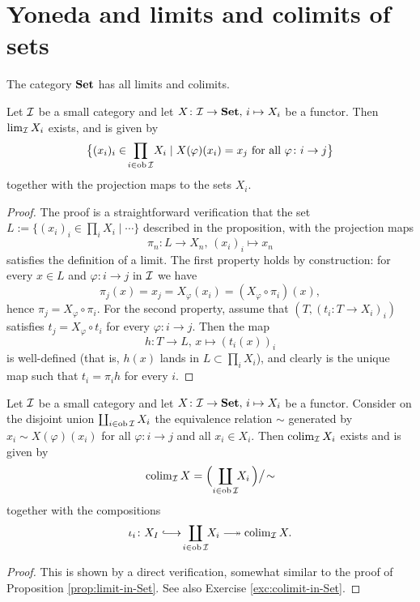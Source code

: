 \section{Yoneda and limits and colimits of sets}

The category $\mathbf{Set}$ has all limits and colimits.

\begin{proposition}\label{prop:limit-in-Set}
Let ${\mathcal{I}}$ be a small category and let $X\colon {\mathcal{I}} \to \mathbf{Set},\, i \mapsto X_i$ be a functor. Then
$\lim_{\mathcal{I}} X_i$ exists, and is given by
\[
	\big\{ (x_i)_i \in \! \prod_{i\in \operatorname{ob}{\mathcal{I}}} \! X_i \mid
	\text{$X(\varphi)(x_i) = x_j$ for all $\varphi\colon i \to j$} \big\}
\]
together with the projection maps to the sets $X_i$.
\end{proposition}

\begin{proof}The proof is a straightforward verification that the set $L:=\{ (x_i)_i \in \! \prod_{i} \! X_i \mid \cdots \}$  described in the proposition, with the projection maps
\[
	\pi_n\colon L\to X_n,\, (x_i)_i \mapsto x_n
\]
satisfies the definition of a limit. The first property holds by construction: for every $x \in L$ and $\varphi\colon i \to j$ in ${\mathcal{I}}$ we have
\[
	\pi_j (x) = x_j = X_\varphi (x_i) = ( X_\varphi \circ \pi_i )(x),
\]
hence $\pi_j = X_\varphi \circ \pi_i$. For the second property, assume that $(T,(t_i\colon T\to X_i)_i)$ satisfies 
$t_j = X_\varphi \circ t_i$ for every $\varphi\colon i\to j$. Then the map 
\[
	h \colon T \to L,\, x \mapsto  (t_i(x))_i 
\]
is well-defined (that is, $h(x)$ lands in $L \subset \prod_i X_i$), and clearly is the unique map such that $t_i = \pi_i h$ for every $i$.
\end{proof}



\begin{proposition}\label{prop:colimit-in-Set}
Let ${\mathcal{I}}$ be a small category and let $X\colon {\mathcal{I}} \to \mathbf{Set},\, i \mapsto X_i$ be a functor. Consider on the disjoint union 
$\coprod_{i\in \operatorname{ob}{\mathcal{I}}}  X_i$
the equivalence relation $\sim$ generated by $x_i \sim X(\varphi)(x_i)$ for all $\varphi\colon i \to j$ and all $x_i \in X_i$. Then 
$\operatorname{colim}_{{\mathcal{I}}} X_i$ exists and is given by
\[
	\operatorname{colim}_{{\mathcal{I}}} X = \Big( \!\coprod_{i\in \operatorname{ob}{\mathcal{I}}}\!\!  X_i\, \Big) \big/ \! \sim
\]
together with the compositions
\[
	\iota_i \colon X_I \longinjto \!\coprod_{i\in \ob\cI} \!\! X_i \longsurjto \colim_{\cI} X.
\]
\end{proposition}

\begin{proof}
This is shown by a direct verification, somewhat similar to the proof of Proposition \ref{prop:limit-in-Set}. See also Exercise \ref{exc:colimit-in-Set}.
\end{proof}



